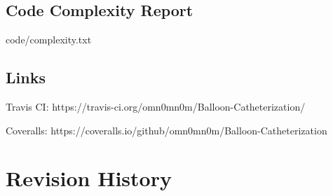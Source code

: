 \documentclass[12pt]{article}
\begin{document}
\subsection{Code Complexity Report}

{code/complexity.txt}

\subsection{Links}
Travis CI: https://travis-ci.org/omn0mn0m/Balloon-Catheterization/

Coveralls: https://coveralls.io/github/omn0mn0m/Balloon-Catheterization

\section{Revision History}
\begin{versionhistory}
\end{versionhistory}
\end{document}
